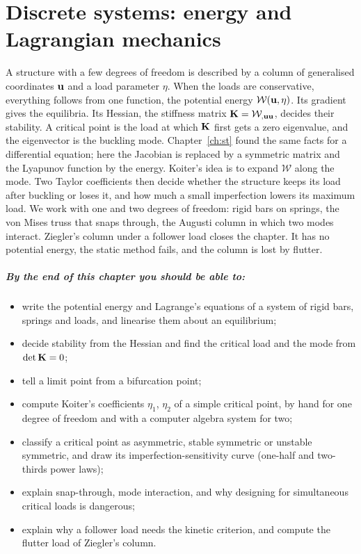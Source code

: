 \chapter{Discrete systems: energy and Lagrangian mechanics}\label{ch:ld}

A structure with a few degrees of freedom is described by a column of
generalised coordinates $\mathbf{u}$ and a load parameter $\eta$. When the loads are
conservative, everything follows from one function, the potential energy
$\mathcal{W}(\mathbf{u},\eta)$. Its gradient gives the equilibria. Its Hessian, the
stiffness matrix $\mathbf{K} = \mathcal{W}_{,\mathbf{u}\mathbf{u}}$, decides their stability. A critical
point is the load at which $\mathbf{K}$ first gets a zero eigenvalue, and the
eigenvector is the buckling mode. Chapter~\ref{ch:st} found the same facts for a
differential equation; here the Jacobian is replaced by a symmetric matrix and the
Lyapunov function by the energy. Koiter's idea is to expand $\mathcal{W}$ along the
mode. Two Taylor coefficients then decide whether the structure keeps its
load after buckling or loses it, and how much a small imperfection lowers its
maximum load. We work with one and two degrees of freedom: rigid bars on springs,
the von Mises truss that snaps through, the Augusti column in which two modes
interact. Ziegler's column under a follower load closes the chapter. It has no
potential energy, the static method fails, and the column is lost by flutter.

\paragraph{By the end of this chapter you should be able to:}
\begin{itemize}
  \item write the potential energy and Lagrange's equations of a system of rigid
        bars, springs and loads, and linearise them about an equilibrium;
  \item decide stability from the Hessian and find the critical load and the mode
        from $\det\mathbf{K} = 0$;
  \item tell a limit point from a bifurcation point;
  \item compute Koiter's coefficients $\eta_1$, $\eta_2$ of a simple critical point,
        by hand for one degree of freedom and with a computer algebra system for two;
  \item classify a critical point as asymmetric, stable symmetric or unstable
        symmetric, and draw its imperfection-sensitivity curve
        (one-half and two-thirds power laws);
  \item explain snap-through, mode interaction, and why designing for simultaneous
        critical loads is dangerous;
  \item explain why a follower load needs the kinetic criterion, and
        compute the flutter load of Ziegler's column.
\end{itemize}

